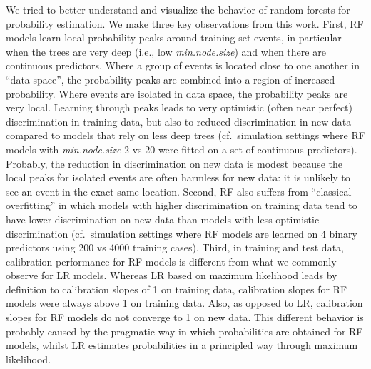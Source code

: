 We tried to better understand and visualize the behavior of random forests for
probability estimation. We make three key observations from this work. First, \gls{RF}
models learn local probability peaks around training set events, in particular
when the trees are very deep (i.e., low \textit{min.node.size}) and when there
are continuous predictors. Where a group of events is located close to one
another in ``data space'', the probability peaks are combined into a region of
increased probability. Where events are isolated in data space, the probability
peaks are very local. Learning through peaks leads to very optimistic (often
near perfect) discrimination in training data, but also to reduced
discrimination in new data compared to models that rely on less deep trees (cf.\
simulation settings where \gls{RF} models with \textit{min.node.size} 2 vs 20 were
fitted on a set of continuous predictors). Probably, the reduction in
discrimination on new data is modest because the local peaks for isolated events
are often harmless for new data: it is unlikely to see an event in the exact
same location. Second, \gls{RF} also suffers from ``classical overfitting'' in which
models with higher discrimination on training data tend to have lower
discrimination on new data than models with less optimistic discrimination (cf.\
simulation settings where \gls{RF} models are learned on 4 binary predictors using 200
vs 4000 training cases). Third, in training and test data, calibration
performance for \gls{RF} models is different from what we commonly observe for \gls{LR}
models. Whereas \gls{LR} based on maximum likelihood leads by definition to
calibration slopes of 1 on training data, calibration slopes for \gls{RF} models were
always above 1 on training data. Also, as opposed to \gls{LR}, calibration slopes for
\gls{RF} models do not converge to 1 on new data. This different behavior is probably
caused by the pragmatic way in which probabilities are obtained for \gls{RF} models,
whilst \gls{LR} estimates probabilities in a principled way through maximum
likelihood.

